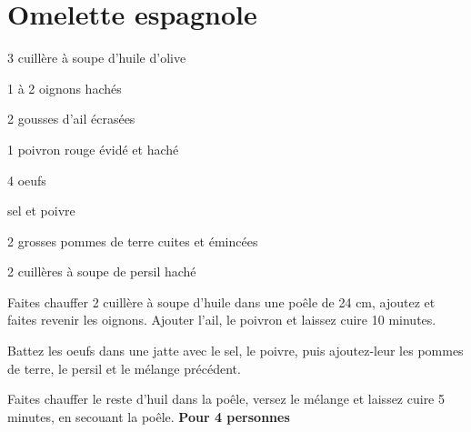 \documentclass[10pt,a4paper]{recettes}
\begin{document}
    \maketitle

    \tableofcontents

    \section{Omelette espagnole}

    \begin{multicols}{2}
        \parbox[1cm]{\textwidth}{
            \begin{ingredients}
                \item 3 cuillère à soupe d'huile d'olive
                \item 1 à 2 oignons hachés
                \item 2 gousses d'ail écrasées
                \item 1 poivron rouge évidé et haché
                \item 4 oeufs
                \item sel et poivre
                \item 2 grosses pommes de terre cuites et émincées
                \item 2 cuillères à soupe de persil haché
            \end{ingredients}
        }

        \columnbreak
        Faites chauffer 2 cuillère à soupe d'huile dans une poêle de 24 cm, ajoutez et faites revenir les oignons. Ajouter l'ail, le poivron et laissez cuire 10 minutes.
        \newline

        Battez les oeufs dans une jatte avec le sel, le poivre, puis ajoutez-leur les pommes de terre, le persil et le mélange précédent.
        \newline

        Faites chauffer le reste d'huil dans la poêle, versez le mélange et laissez cuire 5 minutes, en secouant la poêle.
        \newline
        \newline
        \textbf{Pour 4 personnes}
    \end{multicols}
\end{document}

